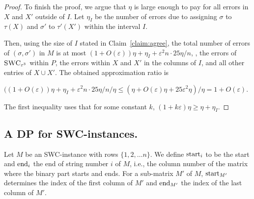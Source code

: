 \begin{proof}
    To finish the proof, we argue that $\eta$ is large enough to pay for all errors in $X$ and $X'$ outside of $I$.
    Let $\eta_I$ be the number of errors due to assigning $\sigma$ to $\tau(X)$ and $\sigma'$ to $\tau'(X')$ within the interval $I$.

    Then, using the size of $I$ stated in Claim~\ref{claim:agree}, the total number of errors of $(\sigma,\sigma')$ in $M$ is at most
    $(1+O(\varepsilon)) \eta + \eta_I + \varepsilon^2 n \cdot 25\eta/n$, \ie, the errors of $\textsc{SWC}_{\varepsilon^3}$ within $P$, the errors within $X$ and $X'$ in the columns of $I$, and all other entries of $X \cup X'$.
    The obtained approximation ratio is

    $((1+O(\varepsilon)) \eta + \eta_I + \varepsilon^2 n \cdot 25\eta/n/\eta 
    \le (\eta + O(\varepsilon) \eta + 25 \varepsilon^2 \eta)/\eta
    = 1 +  O(\varepsilon)$.

    The first inequality uses that for some constant $k$, $(1 + k \varepsilon) \eta \ge \eta + \eta_I$.
\end{proof}

\subsection{A DP for SWC-instances.}
\label{sec:second}

Let $M$ be an SWC-instance with rows  $\{1, 2, \ldots n\}$. 
We define $\textrm{start}_i$ to be the start and $\textrm{end}_i$ the end of string number $i$ of $M$, i.e., the column number of the matrix where the binary part starts and ends.
For a sub-matrix $M'$ of $M$, $\textrm{start}_{M'}$ determines the index of the first column of $M'$ and $\textrm{end}_{M'}$ the index of the last column of $M'$.

